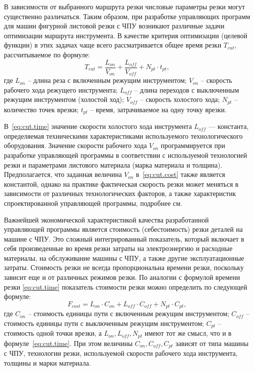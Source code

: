 В зависимости от выбранного маршрута резки
числовые параметры резки могут существенно различаться.
Таким образом, при разработке управляющих программ
для машин фигурной листовой резки с ЧПУ возникают
различные задачи оптимизации маршрута инструмента.
В качестве критерия оптимизации (целевой функции)
в этих задачах чаще всего рассматривается общее время резки
$T_{cut}$,
рассчитываемое по формуле:
\begin{equation}
  T_{cut} = \frac{L_{on}}{V_{on}} + \frac{L_{off}}{V_{off}} +N_{pt} \cdot t_{pt}
  ,
  \label{eq:cut.time}
\end{equation}
где
$L_{on}$ -- длина реза с включенным режущим инструментом;
$V_{on}$ -- скорость рабочего хода режущего инструмента;
$L_{off}$ -- длина переходов с выключенным режущим инструментом (холостой ход);
$V_{off}$ -- скорость холостого хода;
$N_{pt}$ -- количество точек врезки;
$t_{pt}$ -- время, затрачиваемое на одну точку врезки.

В~\eqref{eq:cut.time} значение скорости холостого хода инструмента
$L_{off}$ --- константа, определяемая техническими характеристиками
используемого технологического оборудования.
Значение скорости рабочего хода
$V_{on}$ программируется при разработке управляющей программы
в соответствии с используемой технологией резки и параметрами листового материала
(марка материала и толщина).
Предполагается, что заданная величина
$V_{on}$
в~\eqref{eq:cut.cost}
также является константой,
однако на практике фактическая скорость резки
может меняться в зависимости от различных технологических факторов,
а также характеристик спроектированной управляющей программы,
подробнее см.~\cite{bi:these.tavaeva}

Важнейшей экономической характеристикой качества
разработанной управляющей программы является стоимость
(себестоимость) резки деталей на машине с ЧПУ.
Это сложный интегрированный показатель,
который включает в себя произведенные во время
резки затраты на электроэнергию и расходные материалы,
на обслуживание машины с ЧПУ,
а также другие эксплуатационные затраты.
Стоимость резки не всегда
пропорциональна времени резки,
поскольку зависит еще и от различных режимов резки.
По аналогии с формулой времени резки \eqref{eq:cut.time}
показатель стоимости резки можно определить по следующей формуле:
\begin{equation}
  F_{cost}=
  L_{on} \cdot C_{on} +
  L_{off} \cdot C_{off} +
  N_{pt} \cdot C_{pt}
  ,
  \label{eq:cut.cost}
\end{equation}
где
$C_{on}$ -- стоимость единицы пути с включенным режущим инструментом;
$C_{off}$ -- стоимость единицы пути с выключенным режущим инструментом;
$C_{pt}$ -- стоимость одной точки врезки,
а $L_{on}, L_{off}, N_{pt}$
имеют тот же смысл, что и в формуле~\eqref{eq:cut.time}.
При этом величины $C_{on}, C_{off}, C_{pt}$
зависят от типа машины с ЧПУ,
технологии резки, используемой скорости рабочего хода инструмента,
толщины и марки материала.

